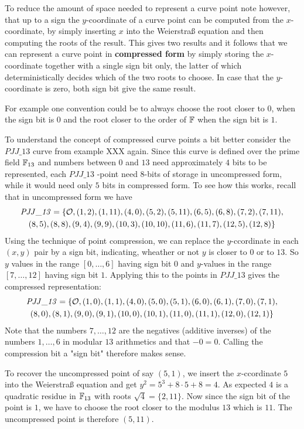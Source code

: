 To reduce the amount of space needed to represent a curve point note however, that up to a sign the $y$-coordinate of a curve point can be computed from the $x$-coordinate, by simply inserting $x$ into the Weierstraß equation and then computing the roots of the result. This gives two results and it follows that we can represent a curve point in \textbf{compressed form} by simply storing the $x$-coordinate together with a single sign bit only, the latter of which deterministically decides which of the two roots to choose. In case that the $y$-coordinate is zero, both sign bit give the same result.

For example one convention could be to always choose the root closer to $0$, when the sign bit is $0$ and the root closer to the order of $\mathbb{F}$ when the sign bit is $1$.

\begin{example} To understand the concept of compressed curve points a bit better consider the $\mathit{PJJ\_13}$ curve from example XXX again. Since this curve is defined over the prime field $\mathbb{F}_{13}$ and numbers between $0$ and $13$ need approximately $4$ bits to be represented, each $\mathit{PJJ\_13}$ -point need $8$-bits of storage in uncompressed form, while it would need only $5$ bits in compressed form. To see how this works, recall that in uncompressed form we have
\begin{multline*}
\mathit{PJJ\_13} = \{\mathcal{O}, (1, 2), (1, 11), (4, 0), (5, 2), (5, 11), (6, 5), (6, 8), (7,2), (7, 11), \\ (8, 5), (8, 8), (9, 4), (9, 9), (10, 3), (10,
10), (11, 6), (11, 7), (12, 5), (12, 8)\}
\end{multline*}
Using the technique of point compression, we can replace the $y$-ccordinate in each $(x,y)$ pair by a sign bit, indicating, wheather or not $y$ is closer to $0$ or to $13$. So $y$ values in the range $[0,\ldots,6]$ having sign bit $0$ and $y$-values in the range $[7,\ldots,12]$ having sign bit $1$. Applying this to the points in $\mathit{PJJ\_13}$ gives the compressed representation:
\begin{multline*}
\mathit{PJJ\_13} = \{\mathcal{O}, (1, 0), (1, 1), (4, 0), (5, 0), (5, 1), (6, 0), (6, 1), (7,0), (7, 1), \\ (8, 0), (8, 1), (9, 0), (9, 1), (10, 0), (10,1), (11, 0), (11, 1), (12, 0), (12, 1)\}
\end{multline*} 
Note that the numbers $7,\ldots, 12$ are the negatives (additive inverses) of the numbers $1,\ldots, 6$ in modular $13$ arithmetics and that $-0=0$. Calling the compression bit a "sign bit" therefore makes sense.

To recover the uncompressed point of say $(5,1)$, we insert the $x$-ccordinate $5$ into the Weierstraß equation and get $y^2 = 5^3 + 8\cdot 5 +8 = 4$. As expected $4$ is a quadratic residue in $\mathbb{F}_{13}$ with roots $\sqrt{4}= \{2,11\}$. Now since the sign bit of the point is $1$, we have to choose the root closer to the modulus $13$ which is $11$. The uncompressed point is therefore $(5,11)$. 
\end{example}
